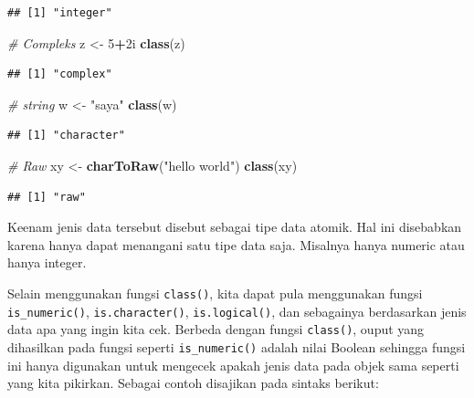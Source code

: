 \documentclass[]{book}
\newenvironment{Shaded}{\begin{snugshade}}{\end{snugshade}}
\newcommand{\KeywordTok}[1]{\textcolor[rgb]{0.13,0.29,0.53}{\textbf{#1}}}
\newcommand{\DecValTok}[1]{\textcolor[rgb]{0.00,0.00,0.81}{#1}}
\newcommand{\StringTok}[1]{\textcolor[rgb]{0.31,0.60,0.02}{#1}}
\newcommand{\CommentTok}[1]{\textcolor[rgb]{0.56,0.35,0.01}{\textit{#1}}}
\newcommand{\OperatorTok}[1]{\textcolor[rgb]{0.81,0.36,0.00}{\textbf{#1}}}
\newcommand{\NormalTok}[1]{#1}
\begin{document}
\begin{verbatim}
## [1] "integer"
\end{verbatim}

\begin{Shaded}
\begin{Highlighting}[]
\CommentTok{# Compleks}
\NormalTok{z <-}\StringTok{ }\DecValTok{5}\OperatorTok{+}\NormalTok{2i}
\KeywordTok{class}\NormalTok{(z)}
\end{Highlighting}
\end{Shaded}

\begin{verbatim}
## [1] "complex"
\end{verbatim}

\begin{Shaded}
\begin{Highlighting}[]
\CommentTok{# string}
\NormalTok{w <-}\StringTok{ "saya"}
\KeywordTok{class}\NormalTok{(w)}
\end{Highlighting}
\end{Shaded}

\begin{verbatim}
## [1] "character"
\end{verbatim}

\begin{Shaded}
\begin{Highlighting}[]
\CommentTok{# Raw}
\NormalTok{xy <-}\StringTok{ }\KeywordTok{charToRaw}\NormalTok{(}\StringTok{"hello world"}\NormalTok{)}
\KeywordTok{class}\NormalTok{(xy)}
\end{Highlighting}
\end{Shaded}

\begin{verbatim}
## [1] "raw"
\end{verbatim}

Keenam jenis data tersebut disebut sebagai tipe data atomik. Hal ini
disebabkan karena hanya dapat menangani satu tipe data saja. Misalnya
hanya numeric atau hanya integer.

Selain menggunakan fungsi \texttt{class()}, kita dapat pula menggunakan
fungsi \texttt{is\_numeric()}, \texttt{is.character()},
\texttt{is.logical()}, dan sebagainya berdasarkan jenis data apa yang
ingin kita cek. Berbeda dengan fungsi \texttt{class()}, ouput yang
dihasilkan pada fungsi seperti \texttt{is\_numeric()} adalah nilai
Boolean sehingga fungsi ini hanya digunakan untuk mengecek apakah jenis
data pada objek sama seperti yang kita pikirkan. Sebagai contoh
disajikan pada sintaks berikut:
\end{document}
